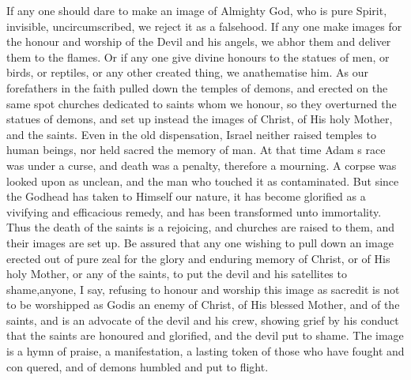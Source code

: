 \documentclass[10pt]{book}
\newcommand{\switchGreek}[1][]{\selectlanguage{polutonikogreek} \switchcolumn*[#1]}
\begin{document}
\begin{paracol}{2}
If any one should 
dare to make an image of Almighty God, who 
is pure Spirit, invisible, uncircumscribed, we 
reject it as a falsehood. If any one make 
images for the honour and worship of the 
Devil and his angels, we abhor them and 
deliver them to the flames. Or if any one give 
divine honours to the statues of men, or birds, 
or reptiles, or any other created thing, we 
anathematise him. As our forefathers in the 
faith pulled down the temples of demons, and 
erected on the same spot churches dedicated 
to saints whom we honour, so they overturned 
the statues of demons, and set up instead the 
images of Christ, of His holy Mother, and the 
saints. Even in the old dispensation, Israel 
neither raised temples to human beings, nor 
held sacred the memory of man. At that time 
Adam s race was under a curse, and death was 
a penalty, therefore a mourning. A corpse 
was looked upon as unclean, and the man who 
touched it as contaminated. But since the 
Godhead has taken to Himself our nature, it 
has become glorified as a vivifying and efficacious
remedy, and has been transformed unto 
immortality. Thus the death of the saints is a 
rejoicing, and churches are raised to them, and 
their images are set up. Be assured that any 
one wishing to pull down an image erected out 
of pure zeal for the glory and enduring memory 
of Christ, or of His holy Mother, or any of the 
saints, to put the devil and his satellites to 
shame,\textemdash anyone, I say, refusing to honour and 
worship this image as sacred\textemdash it is not to be 
worshipped as God\textemdash is an enemy of Christ, of 
His blessed Mother, and of the saints, and is an 
advocate of the devil and his crew, showing 
grief by his conduct that the saints are honoured 
and glorified, and the devil put to shame. The 
image is a hymn of praise, a manifestation, a 
lasting token of those who have fought and con 
quered, and of demons humbled and put to flight. 

\switchGreek


\end{paracol}
\end{document}
